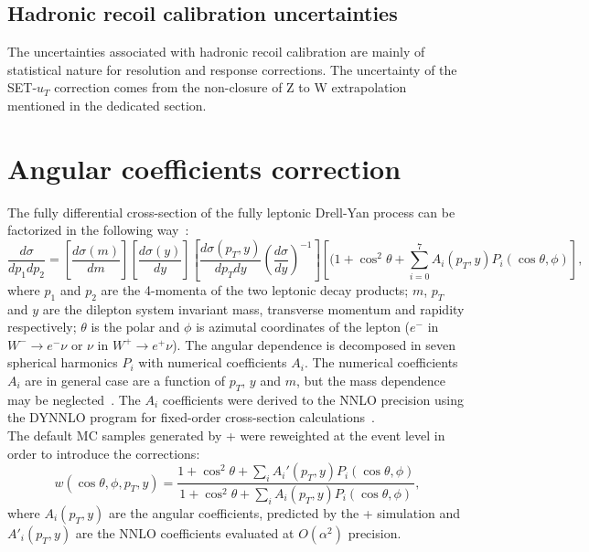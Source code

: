      \subsection{Hadronic recoil calibration uncertainties}
	The uncertainties associated with hadronic recoil calibration are mainly of statistical nature for resolution and response corrections. The uncertainty of the SET-$u_T$ correction comes from the non-closure of Z to W extrapolation mentioned in the dedicated section. 
	\clearpage
     \section{Angular coefficients correction}
     The fully differential cross-section of the fully leptonic Drell-Yan process can be factorized in the following way~\cite{drellyan}:
     \begin{equation}
     	\frac{d\sigma}{dp_1dp_2}=\left[\frac{d\sigma(m)}{dm}\right]\left[\frac{d\sigma(y)}{dy}\right]\left[\frac{d\sigma(p_T,y)}{dp_T dy}\left(\frac{d\sigma}{dy}\right)^{-1}\right]\left[(1+\cos^2{\theta}+\sum_{i=0}^7A_i(p_T,y)P_i(\cos{\theta},\phi)\right],
     \end{equation}
     where $p_1$ and $p_2$ are the 4-momenta of the two leptonic decay products; $m$, $p_T$ and $y$ are the dilepton system invariant mass, transverse momentum and rapidity respectively; $\theta$ is the polar and $\phi$ is azimutal coordinates of the lepton ($e^-$ in $W^-\rightarrow e^-\nu$ or $\nu$ in $W^+\rightarrow e^+\nu$). The angular dependence is decomposed in seven spherical harmonics $P_i$ with numerical coefficients $A_i$. The numerical coefficients $A_i$ are in general case are a function of $p_T$, $y$ and $m$, but the mass dependence may be neglected~\cite{Ais}. The $A_i$ coefficients were derived to the NNLO precision using the DYNNLO program for fixed-order cross-section calculations~\cite{DYNNLO}.\\
     The default MC samples generated by \Powheg+\Pythia{} were reweighted at the event level in order to introduce the corrections:
     \begin{equation}
     	w(\cos{\theta},\phi, p_T, y) = \frac{1+\cos^2{\theta}+\sum_iA_i'(p_T,y)P_i(\cos{\theta},\phi)}{1+\cos^2{\theta}+\sum_iA_i(p_T,y)P_i(\cos{\theta},\phi)},
     \end{equation}
     where $A_i(p_T,y)$ are the angular coefficients, predicted by the \Powheg+\Pythia{} simulation and $A'_i(p_T,y)$ are the NNLO coefficients evaluated at $O(\alpha^2)$ precision.